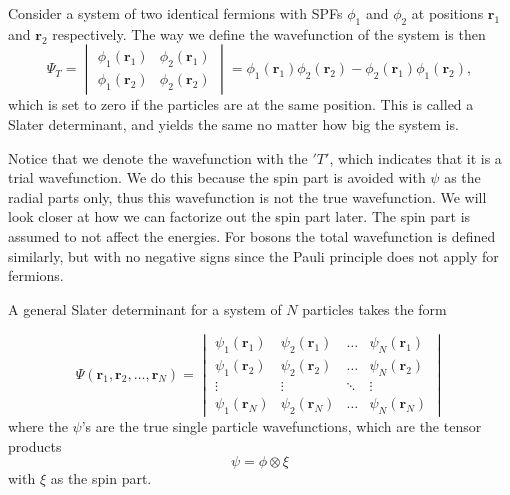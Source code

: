 Consider a system of two identical fermions with SPFs $\phi_1$ and $\phi_2$ at positions $\boldsymbol{r}_1$ and $\boldsymbol{r}_2$ respectively. The way we define the wavefunction of the system is then
\begin{equation}
\Psi_T=
\begin{vmatrix}
\phi_1(\boldsymbol{r}_1) & \phi_2(\boldsymbol{r}_1)\\
\phi_1(\boldsymbol{r}_2) & \phi_2(\boldsymbol{r}_2)
\end{vmatrix}
=\phi_1(\boldsymbol{r}_1)\phi_2(\boldsymbol{r}_2)-\phi_2(\boldsymbol{r}_1)\phi_1(\boldsymbol{r}_2),
\end{equation}
which is set to zero if the particles are at the same position. This is called a Slater determinant, and yields the same no matter how big the system is.

Notice that we denote the wavefunction with the $'T'$, which indicates that it is a trial wavefunction. We do this because the spin part is avoided with $\psi$ as the radial parts only, thus this wavefunction is not the true wavefunction. We will look closer at how we can factorize out the spin part later. The spin part is assumed to not affect the energies. For bosons the total wavefunction is defined similarly, but with no negative signs since the Pauli principle does not apply for fermions. 

A general Slater determinant for a system of $N$ particles takes the form

\begin{equation}
\Psi(\boldsymbol{r}_1,\boldsymbol{r}_2,\hdots,\boldsymbol{r}_N)=
\begin{vmatrix}
\psi_1(\boldsymbol{r}_1) & \psi_2(\boldsymbol{r}_1) & \hdots & \psi_N(\boldsymbol{r}_1)\\
\psi_1(\boldsymbol{r}_2) & \psi_2(\boldsymbol{r}_2) & \hdots & \psi_N(\boldsymbol{r}_2)\\
\vdots & \vdots & \ddots & \vdots \\
\psi_1(\boldsymbol{r}_N) & \psi_2(\boldsymbol{r}_N) & \hdots & \psi_N(\boldsymbol{r}_N)
\end{vmatrix}
\end{equation}
where the $\psi$'s are the true single particle wavefunctions, which are the tensor products 
\begin{equation}
\psi=\phi\otimes\xi
\end{equation}
with $\xi$ as the spin part. 

